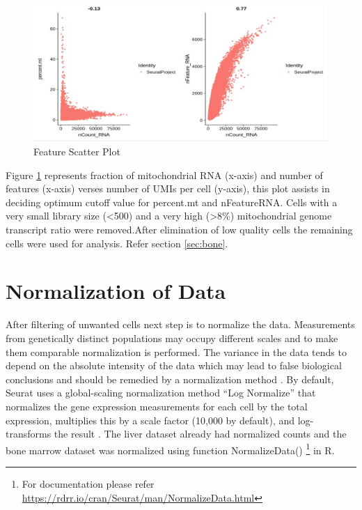 \documentclass{sydneythesis}
\begin{document}
\begin{figure}[H]
  \includegraphics[scale=0.6]{featurescatter.jpg}
  \caption{Feature Scatter Plot}
  \label{fig:fs}
\end{figure}

Figure \ref{fig:fs} represents fraction of mitochondrial RNA (x-axis)
and number of features (x-axis) verses number of UMIs per cell (y-axis),
this plot assists in deciding optimum cutoff value for percent.mt and
nFeatureRNA. Cells with a very small library size (\textless{}500) and a
very high (\textgreater{}8\%) mitochondrial genome transcript ratio were
removed\autocite{ilicic2016classification}.After elimination of low
quality cells the remaining cells were used for analysis. Refer section
\ref{sec:bone}.

\section{Normalization of Data}\label{sec:norm}

After filtering of unwanted cells next step is to normalize the data.
Measurements from genetically distinct populations may occupy different
scales and to make them comparable normalization is performed. The
variance in the data tends to depend on the absolute intensity of the
data which may lead to false biological conclusions and should be
remedied by a normalization method \autocite{evans2017selecting}. By
default, Seurat\autocite{seurat} uses a global-scaling normalization
method ``Log Normalize'' that normalizes the gene expression
measurements for each cell by the total expression, multiplies this by a
scale factor (10,000 by default), and log-transforms the result
\autocite{cole2019performance}. The liver dataset already had normalized
counts and the bone marrow dataset was normalized using function
NormalizeData()
\footnote{For documentation please refer \url{https://rdrr.io/cran/Seurat/man/NormalizeData.html}}
in R\autocite{team2013r}.
\end{document}
